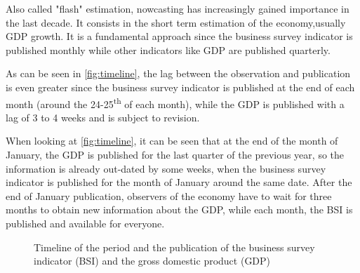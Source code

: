 \documentclass[12pt,a4paper,oneside]{book}
\newcommand{\ImageWidth}{11cm}
\begin{document}
Also called "flash" estimation, nowcasting has increasingly gained importance in the last decade.
It consists in the short term estimation of the economy,usually GDP growth.
It is a fundamental approach since the business survey indicator is published monthly while other indicators like GDP are published quarterly.

As can be seen in \autoref{fig:timeline}, 
the lag between the observation and publication is even greater since the business survey indicator is published at the end of each month (around the 24-25\textsuperscript{th} of each month), while the GDP is published with a lag of 3 to 4 weeks and is subject to revision.

When looking at \autoref{fig:timeline}, it can be seen that at the end of the month of January, the GDP is published for the last quarter of the previous year, so the information is already out-dated by some weeks, when the business survey indicator is published for the month of January around the same date. After the end of January publication, observers of the economy have to wait for three months to obtain new information about the GDP, while each month, the BSI is published and available for everyone.

\begin{figure}[htp!]
     \centering \footnotesize
    \small
    \caption{Timeline of the period and the publication of the business survey indicator (BSI) and the gross domestic product (GDP)}
    \label{fig:timeline}
\end{figure}
\end{document}
